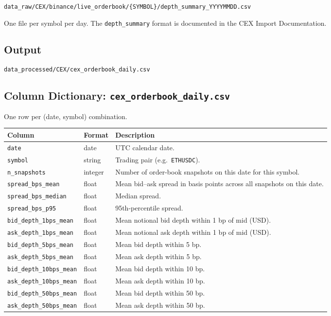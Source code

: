 \documentclass[11pt,a4paper]{article}
\begin{document}
\begin{lstlisting}
data_raw/CEX/binance/live_orderbook/{SYMBOL}/depth_summary_YYYYMMDD.csv
\end{lstlisting}

One file per symbol per day. The \texttt{depth\_summary} format is
documented in the CEX Import Documentation.

\subsection{Output}

\begin{lstlisting}
data_processed/CEX/cex_orderbook_daily.csv
\end{lstlisting}

\subsection{Column Dictionary: \texttt{cex\_orderbook\_daily.csv}}

One row per (date, symbol) combination.

\begin{xltabular}{\linewidth}{L{4.5cm}L{3.0cm}Y}
\toprule
\textbf{Column} & \textbf{Format} & \textbf{Description} \\
\midrule
\texttt{date} & date & UTC calendar date. \\
\texttt{symbol} & string & Trading pair (e.g.\ \texttt{ETHUSDC}). \\
\texttt{n\_snapshots} & integer & Number of order-book snapshots on this
  date for this symbol. \\
\texttt{spread\_bps\_mean} & float & Mean bid--ask spread in basis points
  across all snapshots on this date. \\
\texttt{spread\_bps\_median} & float & Median spread. \\
\texttt{spread\_bps\_p95} & float & 95th-percentile spread. \\
\texttt{bid\_depth\_1bps\_mean} & float & Mean notional bid depth within
  1 bp of mid (USD). \\
\texttt{ask\_depth\_1bps\_mean} & float & Mean notional ask depth within
  1 bp of mid (USD). \\
\texttt{bid\_depth\_5bps\_mean} & float & Mean bid depth within 5 bp. \\
\texttt{ask\_depth\_5bps\_mean} & float & Mean ask depth within 5 bp. \\
\texttt{bid\_depth\_10bps\_mean} & float & Mean bid depth within 10 bp. \\
\texttt{ask\_depth\_10bps\_mean} & float & Mean ask depth within 10 bp. \\
\texttt{bid\_depth\_50bps\_mean} & float & Mean bid depth within 50 bp. \\
\texttt{ask\_depth\_50bps\_mean} & float & Mean ask depth within 50 bp. \\
\bottomrule
\end{xltabular}
\end{document}

